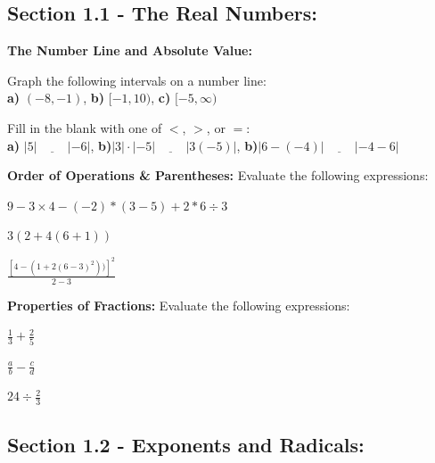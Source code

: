 \documentclass[10pt]{article}
\begin{document}
\subsection*{Section 1.1 - The Real Numbers:}

 \hspace*{-.2in}\textbf{The Number Line and Absolute Value:}
\begin{list}{\bf{Problem . }}{}

\item Graph the following intervals on a number line:\\
	\textbf{a)} $(-8, -1)$, \hspace*{.5in} \textbf{b)} $[-1,10)$, \hspace*{.5in} \textbf{c)} $[-5,\infty)$
	\vfill
	
\item Fill in the blank with one of $<$, $>$, or $=$:\\
	\textbf{a)} $|5| \  \underline{\qquad} \ |-6|$, \hspace*{.5in} \textbf{b)}$|3|\cdot|-5| \  \underline{\qquad} \ |3(-5)|$,
	 \hspace*{.5in} \textbf{b)}$|6-(-4)| \  \underline{\qquad} \ |-4-6|$
\vfill
	 
 \hspace*{-.5in}\textbf{Order of Operations \& Parentheses:}  Evaluate the following expressions:

\item $9-3\times4-(-2)*(3-5)+2*6\div3$ \label{sally}
\vfill
\item $3(2+4(6+1)) $
\vfill
\item $ \frac{\left[4-(1+2(6-3)^2))\right]^2}{2-3} $
	 
	 \vfill
 \hspace*{-.5in}\textbf{Properties of Fractions:}  Evaluate the following expressions:
\item $\frac{1}{3}+\frac{2}{5}$
\vfill
\item $\frac{a}{b}-\frac{c}{d}$
\vfill
\item $24 \div \frac{2}{3}$

\vfill

\pagebreak
\subsection*{Section 1.2 - Exponents and Radicals:}


\end{list}
\end{document}
